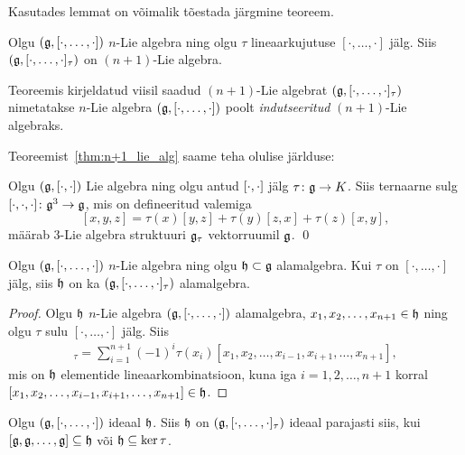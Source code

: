 Kasutades lemmat on võimalik tõestada järgmine teoreem. \cite{AKMS:2014}

\begin{thm}\label{thm:n+1_lie_alg}
    Olgu $(\mathfrak{g}, [\cdot, \dots, \cdot])$ $n$-Lie algebra ning olgu $\tau$
    lineaarkujutuse $[\cdot, \dots, \cdot]$ jälg. Siis
    $(\mathfrak{g}, [\cdot, \dots, \cdot]_\tau)$ on $(n+1)$-Lie algebra.
\end{thm}

Teoreemis kirjeldatud viisil saadud $(n+1)$-Lie algebrat
$(\mathfrak{g}, [\cdot, \dots, \cdot]_\tau)$ nimetatakse $n$-Lie algebra
$(\mathfrak{g}, [\cdot, \dots, \cdot])$ poolt \emph{indutseeritud}
$(n+1)$-Lie algebraks.

Teoreemist~\ref{thm:n+1_lie_alg} saame teha olulise järlduse:

\begin{jar}
    Olgu $(\mathfrak{g}, \left[ \cdot, \cdot \right])$ Lie algebra ning olgu antud
    $\left[ \cdot, \cdot \right]$ jälg $\tau \colon \mathfrak{g} \to K$. Siis ternaarne sulg
    $[ \cdot, \cdot, \cdot ] \colon \mathfrak{g}^3 \to \mathfrak{g}$, mis on defineeritud
    valemiga
    \[
        [x, y, z] = \tau(x)[y, z] + \tau(y)[z, x] + \tau(z)[x, y],
    \]
    määrab $3$-Lie algebra struktuuri $\mathfrak{g}_\tau$ vektorruumil $\mathfrak{g}$.
    \hfill \qed
\end{jar}

\begin{lau}\label{lause:indutseeritud-alamalgebra}
    Olgu $(\mathfrak{g}, [\cdot, \dots, \cdot])$ $n$-Lie algebra ning olgu
    $\mathfrak{h} \subset \mathfrak{g}$ alamalgebra. Kui $\tau$ on $[\cdot, \dots, \cdot]$ jälg,
    siis $\mathfrak{h}$ on ka $(\mathfrak{g}, [\cdot, \dots, \cdot]_\tau)$ alamalgebra.
\end{lau}

\begin{proof}
    Olgu $\mathfrak{h}$ $n$-Lie algebra $(\mathfrak{g}, [\cdot, \dots, \cdot])$ alamalgebra,
    $x_1, x_2, \dots, x_{n+1} \in \mathfrak{h}$ ning olgu $\tau$ sulu
    $[\cdot, \dots, \cdot]$ jälg. Siis
    \begin{align*}
        [x_1, x_2, \dots, x_{n+1}]_\tau =  \sum_{i=1}^{n+1} (-1)^i \tau(x_i)
        [x_1, x_2, \dots, x_{i-1}, x_{i+1}, \dots, x_{n+1}],
    \end{align*}
    mis on $\mathfrak{h}$ elementide lineaarkombinatsioon, kuna iga
    $i = 1, 2, \dots, n+1$ korral
    $[x_1, x_2, \dots, x_{i-1}, x_{i+1}, \dots, x_{n+1}] \in \mathfrak{h}$.
\end{proof}

\begin{lau}\label{lause:indutseeritud-ideaal}
    Olgu $(\mathfrak{g}, [\cdot, \dots, \cdot])$ ideaal $\mathfrak{h}$. Siis $\mathfrak{h}$ on
    $(\mathfrak{g}, [\cdot, \dots, \cdot]_\tau)$ ideaal parajasti siis, kui
    $[\mathfrak{g}, \mathfrak{g}, \dots, \mathfrak{g}] \subseteq \mathfrak{h}$ või $\mathfrak{h} \subseteq \ker \tau$.
\end{lau}

